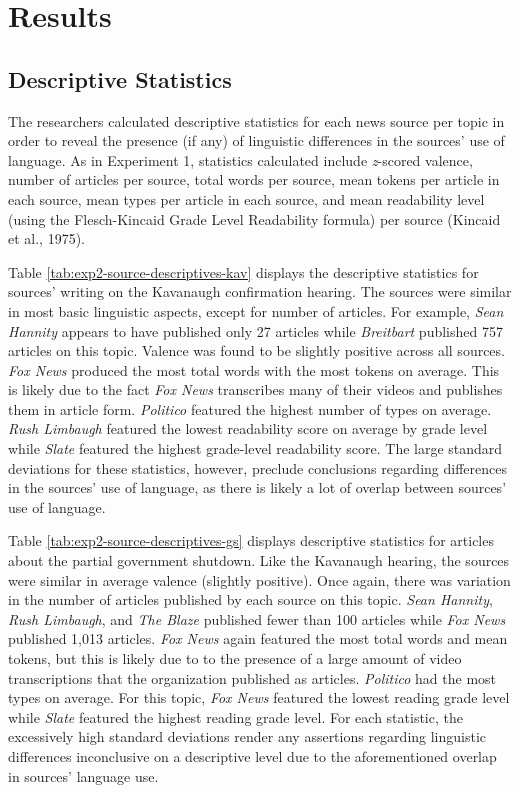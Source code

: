 \documentclass[english,,man]{apa6}
\begin{document}
\section{Results}\label{results-1}

\subsection{Descriptive Statistics}\label{descriptive-statistics-1}

The researchers calculated descriptive statistics for each news source
per topic in order to reveal the presence (if any) of linguistic
differences in the sources' use of language. As in Experiment 1,
statistics calculated include \emph{z}-scored valence, number of
articles per source, total words per source, mean tokens per article in
each source, mean types per article in each source, and mean readability
level (using the Flesch-Kincaid Grade Level Readability formula) per
source (Kincaid et al., 1975).

Table \ref{tab:exp2-source-descriptives-kav} displays the descriptive
statistics for sources' writing on the Kavanaugh confirmation hearing.
The sources were similar in most basic linguistic aspects, except for
number of articles. For example, \emph{Sean Hannity} appears to have
published only 27 articles while \emph{Breitbart} published 757 articles
on this topic. Valence was found to be slightly positive across all
sources. \emph{Fox News} produced the most total words with the most
tokens on average. This is likely due to the fact \emph{Fox News}
transcribes many of their videos and publishes them in article form.
\emph{Politico} featured the highest number of types on average.
\emph{Rush Limbaugh} featured the lowest readability score on average by
grade level while \emph{Slate} featured the highest grade-level
readability score. The large standard deviations for these statistics,
however, preclude conclusions regarding differences in the sources' use
of language, as there is likely a lot of overlap between sources' use of
language.

Table \ref{tab:exp2-source-descriptives-gs} displays descriptive
statistics for articles about the partial government shutdown. Like the
Kavanaugh hearing, the sources were similar in average valence (slightly
positive). Once again, there was variation in the number of articles
published by each source on this topic. \emph{Sean Hannity}, \emph{Rush
Limbaugh}, and \emph{The Blaze} published fewer than 100 articles while
\emph{Fox News} published 1,013 articles. \emph{Fox News} again featured
the most total words and mean tokens, but this is likely due to to the
presence of a large amount of video transcriptions that the organization
published as articles. \emph{Politico} had the most types on average.
For this topic, \emph{Fox News} featured the lowest reading grade level
while \emph{Slate} featured the highest reading grade level. For each
statistic, the excessively high standard deviations render any
assertions regarding linguistic differences inconclusive on a
descriptive level due to the aforementioned overlap in sources' language
use.
\end{document}
